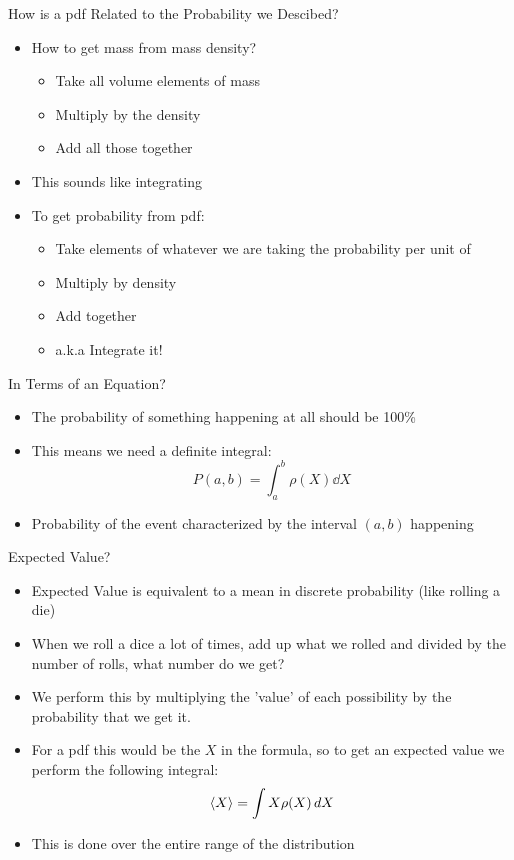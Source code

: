 \documentclass{beamer}
\begin{document}
\begin{frame}{How is a pdf Related to the Probability we Descibed?}
  \begin{itemize}
  \item How to get mass from mass density?
    \begin{itemize}
    \item Take all volume elements of mass
    \item Multiply by the density
    \item Add all those together
    \end{itemize}
  \item This sounds like integrating
  \item To get probability from pdf:
    \begin{itemize}
    \item Take elements of whatever we are taking the probability per unit of
    \item Multiply by density
    \item Add together
    \item a.k.a Integrate it!
    \end{itemize}
  \end{itemize}
\end{frame}
\begin{frame}{In Terms of an Equation?}
  \begin{itemize}
  \item The probability of something happening at all should be 100\%
  \item This means we need a definite integral:
    \begin{equation}
      P(a,b)=\int_a^b\rho(X)\dd{X}
    \end{equation}
  \item Probability of the event characterized by the interval $(a,b)$ happening
  \end{itemize}
\end{frame}
\begin{frame}{Expected Value?}
  \begin{itemize}
  \item Expected Value is equivalent to a mean in discrete probability (like rolling a die)
  \item When we roll a dice a lot of times, add up what we rolled and divided by the number of rolls, what number do we get?
  \item We perform this by multiplying the 'value' of each possibility by the probability that we get it. 
  \item For a pdf this would be the $X$ in the formula, so to get an expected value we perform the following integral:
    \begin{equation}
      \ev{X}=\int X\rho(X)\dd{X}
    \end{equation}
  \item This is done over the entire range of the distribution
  \end{itemize}
\end{frame}
\end{document}

